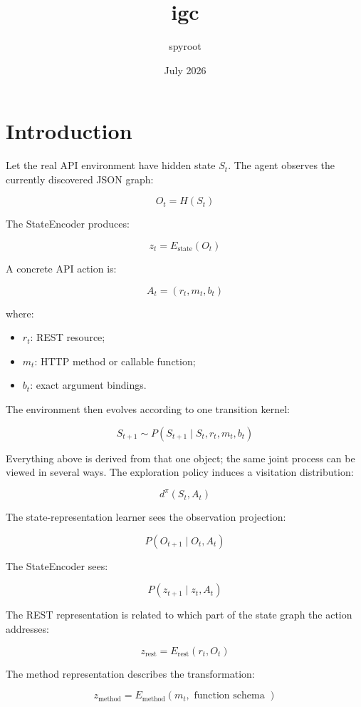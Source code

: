 \documentclass{article}
\title{igc}
\author{spyroot}
\date{July 2026}
\begin{document}
\maketitle

\section{Introduction}

Let the real API environment have hidden state $S_t$. The agent observes the currently discovered JSON graph:

$$
O_t = H\left(S_t\right)
$$

The StateEncoder produces:

$$
z_t = E_{\text{state}}\left(O_t\right)
$$

A concrete API action is:

$$
A_t = \left(r_t, m_t, b_t\right)
$$

where:

\begin{itemize}
  \item $r_t$: REST resource;
  \item $m_t$: HTTP method or callable function;
  \item $b_t$: exact argument bindings.
\end{itemize}

The environment then evolves according to one transition kernel:

$$
S_{t+1} \sim P\left(S_{t+1} \mid S_t, r_t, m_t, b_t\right)
$$

Everything above is derived from that one object; the same joint process can be viewed in several ways. The exploration policy induces a visitation distribution:

$$
d^\pi\left(S_t, A_t\right)
$$

The state-representation learner sees the observation projection:

$$
P\left(O_{t+1} \mid O_t, A_t\right)
$$

The StateEncoder sees:

$$
P\left(z_{t+1} \mid z_t, A_t\right)
$$

The REST representation is related to which part of the state graph the action addresses:

$$
z_{\text{rest}} = E_{\text{rest}}\left(r_t, O_t\right)
$$

The method representation describes the transformation:

$$
z_{\text{method}} = E_{\text{method}}\left(m_t, \text{ function schema }\right)
$$
\end{document}
